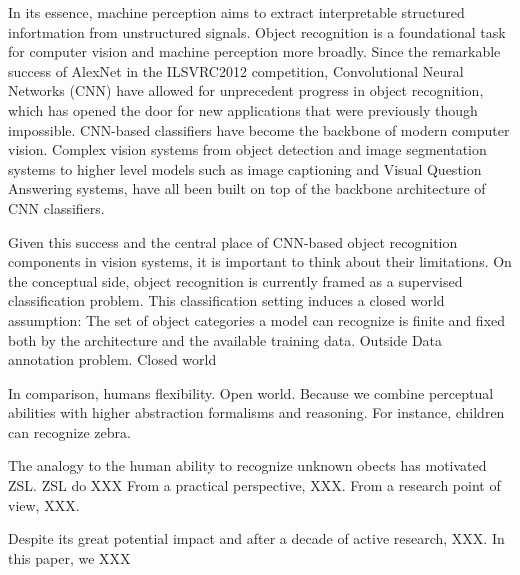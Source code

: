 

\begin{abstracts}        %

In its essence, machine perception aims to extract interpretable structured infortmation from unstructured signals.
Object recognition is a foundational task for computer vision and machine perception more broadly.
Since the remarkable success of AlexNet in the ILSVRC2012 competition, 
Convolutional Neural Networks (CNN) have allowed for unprecedent progress in object recognition,
which has opened the door for new applications that were previously though impossible. 
CNN-based classifiers have become the backbone of modern computer vision.
Complex vision systems from object detection and image segmentation systems to 
higher level models such as image captioning and Visual Question Answering systems, 
have all been built on top of the backbone architecture of CNN classifiers.

Given this success and the central place of CNN-based object recognition components in vision systems, 
it is important to think about their limitations.
On the conceptual side, object recognition is currently framed as a supervised classification problem.
This classification setting induces a closed world assumption: 
The set of object categories a model can recognize is finite and fixed both by the architecture and the available training data.
Outside 
Data annotation problem.
Closed world

In comparison, humans flexibility.
Open world.
Because we combine perceptual abilities with higher abstraction formalisms and reasoning.
For instance, children can recognize zebra.

The analogy to the human ability to recognize unknown obects has motivated ZSL.
ZSL do XXX
From a practical perspective, XXX.
From a research point of view, XXX.

Despite its great potential impact and after a decade of active research, XXX.
In this paper, we XXX




\end{abstracts}


